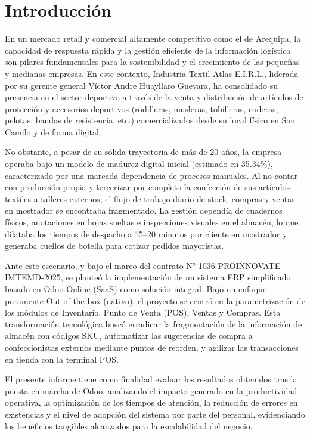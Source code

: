 \section{Introducción}

En un mercado retail y comercial altamente competitivo como el de Arequipa, la capacidad de respuesta rápida y la gestión eficiente de la información logística son pilares fundamentales para la sostenibilidad y el crecimiento de las pequeñas y medianas empresas. En este contexto, Industria Textil Atlas E.I.R.L., liderada por su gerente general Víctor Andre Huayllaro Guevara, ha consolidado su presencia en el sector deportivo a través de la venta y distribución de artículos de protección y accesorios deportivos (rodilleras, musleras, tobilleras, coderas, pelotas, bandas de resistencia, etc.) comercializados desde su local físico en San Camilo y de forma digital.

No obstante, a pesar de su sólida trayectoria de más de 20 años, la empresa operaba bajo un modelo de madurez digital inicial (estimado en 35.34\%), caracterizado por una marcada dependencia de procesos manuales. Al no contar con producción propia y tercerizar por completo la confección de sus artículos textiles a talleres externos, el flujo de trabajo diario de stock, compras y ventas en mostrador se encontraba fragmentado. La gestión dependía de cuadernos físicos, anotaciones en hojas sueltas e inspecciones visuales en el almacén, lo que dilataba los tiempos de despacho a 15--20 minutos por cliente en mostrador y generaba cuellos de botella para cotizar pedidos mayoristas.

Ante este escenario, y bajo el marco del contrato N° 1036-PROINNOVATE-IMTEMD-2025, se planteó la implementación de un sistema ERP simplificado basado en Odoo Online (SaaS) como solución integral. Bajo un enfoque puramente Out-of-the-box (nativo), el proyecto se centró en la parametrización de los módulos de Inventario, Punto de Venta (POS), Ventas y Compras. Esta transformación tecnológica buscó erradicar la fragmentación de la información de almacén con códigos SKU, automatizar las sugerencias de compra a confeccionistas externos mediante puntos de reorden, y agilizar las transacciones en tienda con la terminal POS.

El presente informe tiene como finalidad evaluar los resultados obtenidos tras la puesta en marcha de Odoo, analizando el impacto generado en la productividad operativa, la optimización de los tiempos de atención, la reducción de errores en existencias y el nivel de adopción del sistema por parte del personal, evidenciando los beneficios tangibles alcanzados para la escalabilidad del negocio.
